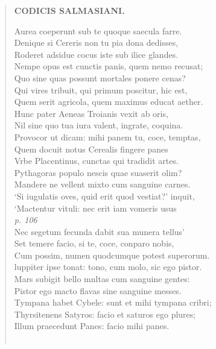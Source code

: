 \documentclass[11pt, a4paper]{report}
\begin{document}
\begin{verse}
    \begin{center} \textbf{CODICIS SALMASIANI.} \end{center} \marginpar{[167]} Aurea coeperunt sub te quoque saecula farre. \\ Denique si Cereris non tu pia dona dedisses, \\ Roderet adsidue cocus iste sub ilice glandes. \\ Nempe opus est cunctis panis, quem nemo recusat; \\ Quo sine quas possunt mortales ponere cenas? \\ Qui vires tribuit, qui primum poscitur, hic est, \\ Quem serit agricola, quem maximus educat aether. \\ Hunc pater Aeneas Troianis vexit ab oris, \\ Nil sine quo tua iura valent, ingrate, coquina. \\ Provocor ut dicam: mihi panem tu, coce, temptas, \\ Quem docuit notus Cerealis fingere panes \\ Vrbe Placentinus, cunctas qui tradidit artes. \\ Pythagoras populo nescis quae suaserit olim? \\ Mandere ne vellent mixto cum sanguine carnes. \\ ‘Si iugulatis oves, quid erit quod vestiat?’ inquit, \\ ‘Mactentur vituli: nec erit iam vomeris usus \\ \textit{p. 106} \\ Nec segetum fecunda dabit sua munera tellus’ \\ Set temere facio, si te, coce, conparo nobis, \\ Cum possim, numen quodcumque potest superorum. \\ luppiter ipse tonat: tono, cum molo, sic ego pistor. \\ Mars subigit bello mnltas cum sanguine gentes: \\ Pistor ego macto flavas sine sanguine messes. \\ Tympana habet Cybele: sunt et mihi tympana cribri; \\ Thyrsitenens Satyros: facio et saturos ego plures; \\ Illum praecedunt Panes: facio mihi panes. \\ 
        ﻿\pagebreak 

\end{verse}
\end{document}
